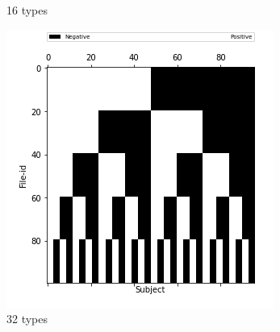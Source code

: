 \documentclass[10pt, conference, compsocconf]{IEEEtran}
\begin{document}
\begin{figure}
\begin{subfigure}[b]{0.4\linewidth}
                  \caption{16 types}
        \end{subfigure}
                \begin{subfigure}[b]{0.4\linewidth}
                  \includegraphics[width=\columnwidth]{data/Utility_Matrix/Synthetic/synthetic_subject_types/32_SubjectType_utility_matrix.png}
                  \caption{32 types}
        \end{subfigure}
                \begin{subfigure}[b]{0.4\linewidth}

\end{subfigure}
\end{figure}
\end{document}
